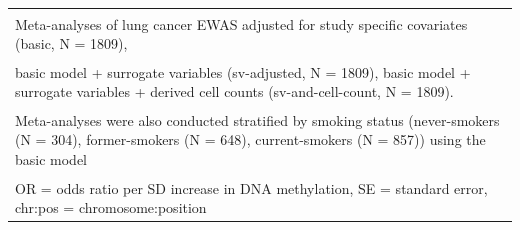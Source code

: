 \documentclass[11pt,twoside]{bristolthesis}
\begin{document}
\begin{landscape}
\begin{table}[!h]
{\begin{tabular}[t]{lllllllllllllllllllll}
\bottomrule
\multicolumn{21}{l}{\textsuperscript{} Meta-analyses of lung cancer EWAS adjusted for study specific covariates (basic, N = 1809),}\\
\multicolumn{21}{l}{\textsuperscript{} basic model + surrogate variables (sv-adjusted, N = 1809), basic model + surrogate variables + derived cell counts (sv-and-cell-count, N = 1809).}\\
\multicolumn{21}{l}{\textsuperscript{} Meta-analyses were also conducted stratified by smoking status (never-smokers (N = 304), former-smokers (N = 648), current-smokers (N = 857)) using the basic model}\\
\multicolumn{21}{l}{\textsuperscript{} OR = odds ratio per SD increase in DNA methylation, SE = standard error, chr:pos = chromosome:position}\\
\end{tabular}}
\end{table}
\end{landscape}
\end{document}
